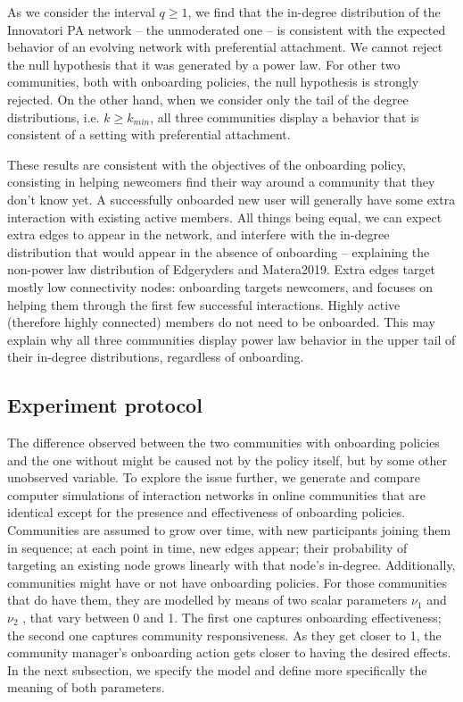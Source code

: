 \documentclass{article}
\begin{document}
As we consider the interval  $q \geq 1$, we find that the in-degree distribution of the Innovatori PA network -- the unmoderated one -- is consistent with the expected behavior of an evolving network with preferential attachment. We cannot reject the null hypothesis that it was generated by a power law. For other two communities, both with onboarding policies, the null hypothesis is strongly rejected. On the other hand, when we consider only the tail of the degree distributions, i.e. $k \geq k_{min}$, all three communities display a behavior that is consistent of a setting with preferential attachment.

These results are consistent with the objectives of the onboarding policy, consisting in helping newcomers find their way around a community that they don't know yet. A successfully onboarded new user will generally have some extra interaction with existing active members. All things being equal, we can expect extra edges to appear in the network, and interfere with the in-degree distribution that would appear in the absence of onboarding -- explaining the non-power law distribution of Edgeryders and Matera2019. Extra edges target mostly low connectivity nodes: onboarding targets newcomers, and focuses on helping them through the first few successful interactions. Highly active (therefore highly connected) members do not need to be onboarded. This may explain why all three communities display power law behavior in the upper tail of their in-degree distributions, regardless of onboarding. 

\subsection{Experiment protocol}
\label{ss:experiment_protocol}
The difference observed between the two communities with onboarding policies and the one without might be caused not by the policy itself, but by some other unobserved variable. To explore the issue further, we generate and compare computer simulations of interaction networks in online communities that are identical except for the presence and effectiveness of onboarding policies. Communities are assumed to grow over time, with new participants joining them in sequence; at each point in time, new edges appear; their probability of targeting an existing node grows linearly with that node's in-degree. Additionally, communities might have or not have onboarding policies. For those communities that do have them, they are modelled by means of two scalar parameters $\nu_1$  and $\nu_2$ , that vary between 0 and 1. The first one captures onboarding effectiveness;  the second one captures community responsiveness. As they get closer to 1, the community manager's onboarding action gets closer to having the desired effects. In the next subsection, we specify the model and define more specifically the meaning of both parameters.
\end{document}

